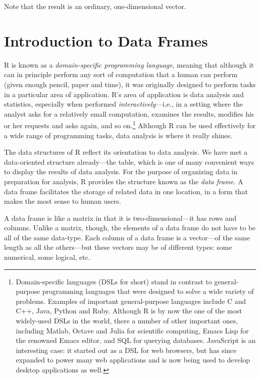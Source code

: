\documentclass[]{book}
\let\rmarkdownfootnote\footnote%
\def\footnote{\protect\rmarkdownfootnote}
\theoremstyle{definition}
\theoremstyle{definition}
\theoremstyle{remark}
\begin{document}
{Note that the result is an ordinary, one-dimensional vector.

\section{Introduction to Data Frames}\label{introduction-to-data-frames}

R is known as a \emph{domain-specific programming language}, meaning
that although it can in principle perform any sort of computation that a
human can perform (given enough pencil, paper and time), it was
originally designed to perform tasks in a particular area of
application. R's area of application is data analysis and statistics,
especially when performed \emph{interactively}---i.e., in a setting
where the analyst asks for a relatively small computation, examines the
results, modifies his or her requests and asks again, and so
on.\footnote{Domain-specific languages (DSLs for short) stand in
  contrast to general-purpose programming languages that were designed
  to solve a wide variety of problems. Examples of important
  general-purpose languages include C and C++, Java, Python and Ruby.
  Although R is by now the one of the most widely-used DSLs in the
  world, there a number of other important ones, including Matlab,
  Octave and Julia for scientific computing, Emacs Lisp for the renowned
  Emacs editor, and SQL for querying databases. JavaScript is an
  interesting case: it started out as a DSL for web browsers, but has
  since expanded to power many web applications and is now being used to
  develop desktop applications as well.} Although R can be used
effectively for a wide range of programming tasks, data analysis is
where it really shines.

The data structures of R reflect its orientation to data analysis. We
have met a data-oriented structure already---the table, which is one of
many convenient ways to display the results of data analysis. For the
purpose of organizing data in preparation for analysis, R provides the
structure known as the \emph{data frame}. A data frame
facilitates the storage of related data in one location, in a form that
makes the most sense to human users.

A data frame is like a matrix in that it is two-dimensional---it has
rows and columns. Unlike a matrix, though, the elements of a data frame
do not have to be all of the same data-type. Each column of a data frame
is a vector---of the same length as all the others---but these vectors
may be of different types: some numerical, some logical, etc.

}
\end{document}
